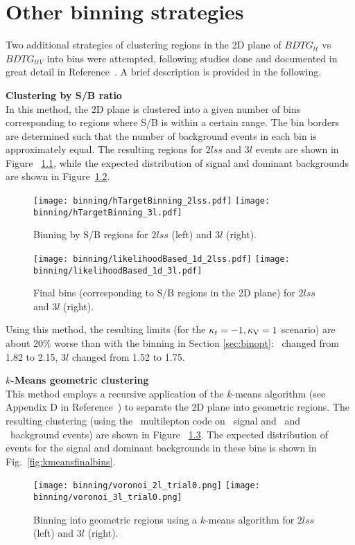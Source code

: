 \chapter{Other binning strategies}\label{app:ad_binning}

Two additional strategies of clustering regions in the 2D plane of $BDTG_{tt}$ vs $BDTG_{ttV}$ into bins were attempted, following studies done and documented in great detail in Reference~\cite{CMS_AN_2017-029}. A brief description is provided in the following.

\textbf{Clustering by S/B ratio}\\
In this method, the 2D plane is clustered into a given number of bins corresponding to regions where S/B is within a certain range. The bin borders are determined such that the number of background events in each bin is approximately equal. The resulting regions for $2lss$ and $3l$  events are shown in Figure ~\ref{fig:sbbinning}, while the expected distribution of signal and dominant backgrounds are shown in Figure~\ref{fig:sbfinalbins}.

\begin{figure} [!h]
  \centering
  \texttt{[image: binning/hTargetBinning\_2lss.pdf]}
  \texttt{[image: binning/hTargetBinning\_3l.pdf]}
  \caption{Binning by S/B regions for $2lss$ (left) and $3l$ (right).}
  \label{fig:sbbinning}
\end{figure}

\begin{figure} [!h]
  \centering
  \texttt{[image: binning/likelihoodBased\_1d\_2lss.pdf]}
  \texttt{[image: binning/likelihoodBased\_1d\_3l.pdf]}
  \caption[Final bins (corresponding to S/B regions in the 2D plane)]{Final bins (corresponding to S/B regions in the 2D plane) for $2lss$ and $3l$ (right).}
  \label{fig:sbfinalbins}
\end{figure}

Using this method, the resulting limits (for the $\kappa_t=-1, \kappa_\text{V}=1$ scenario) are about 20\% worse than with the binning in Section \ref{sec:binopt}: \mumu\ changed from 1.82 to 2.15, $3l$ changed from 1.52 to 1.75.

\textbf{$k$-Means geometric clustering}\\
This method employs a recursive application of the $k$-means algorithm (see Appendix D in Reference~\cite{CMS_AN_2017-029}) to separate the 2D plane into geometric regions. The resulting clustering (using the \ttH\ multilepton code on \tHq\ signal and \ttbar\ and \ttV\ background events) are shown in Figure ~\ref{fig:kmeansbinning}. The expected distribution of events for the signal and dominant backgrounds in these bins is shown in Fig.~\ref{fig:kmeansfinalbins}.
\begin{figure} [!h]
  \centering
  \texttt{[image: binning/voronoi\_2l\_trial0.png]}
  \texttt{[image: binning/voronoi\_3l\_trial0.png]}
  \caption[Binning into geometric regions using a $k$-means algorithm.]{Binning into geometric regions using a $k$-means algorithm for $2lss$ (left) and $3l$ (right).}
  \label{fig:kmeansbinning}
\end{figure}

